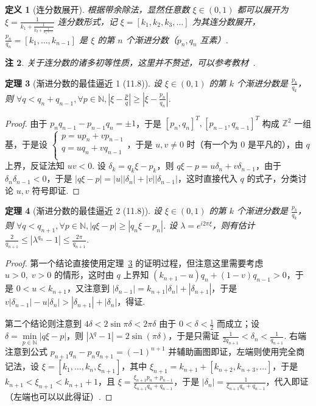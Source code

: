 \documentclass[11pt, a4paper, oneside]{ctexart}
\newtheorem{theorem}{定理}[section]
\newtheorem{definition}[theorem]{定义}
\newtheorem{remark}[theorem]{注}
\newcommand{\N}{\mathbb{N}}
\newcommand{\Z}{\mathbb{Z}}
\newcommand{\abs}[1]{\left|{#1}\right|}
\begin{document}
    \begin{definition}[连分数展开]
        根据带余除法，显然任意数 $\xi\in (0,1)$ 都可以展开为 $\xi=\frac{1}{k_1+\frac{1}{k_2+\frac{1}{k_3+\cdots}}}$ 连分数形式，记 $\xi=[k_1,k_2,k_3,\ldots]$ 为其连分数展开，$\frac{p_n}{q_n}=[k_1,\ldots,k_{n-1}]$ 是 $\xi$ 的第 $n$ 个渐进分数（$p_n,q_n$ 互素）.
    \end{definition}
    \begin{remark}
        关于连分数的诸多初等性质，这里并不赘述，可以参考教材~\cite{zorich}.
    \end{remark}

    \begin{theorem}[渐进分数的最佳逼近 1 (11.8)]\label{定理11.8.1}
        设 $\xi\in (0,1)$ 的第 $k$ 个渐进分数是 $\frac{p_k}{q_k}$，则 $\forall q<q_n+q_{n-1},\forall p\in\N,\abs{\xi-\frac{p}{q}}\geq\abs{\xi-\frac{p_n}{q_n}}$.
    \end{theorem}
    \begin{proof}
        由于 $p_n q_{n-1}-p_{n-1}q_n=\pm 1$，于是 ${[p_n,q_n]}^T,{[p_{n-1},q_{n-1}]}^T$ 构成 $\Z^2$ 一组基，于是设 $\begin{cases}
            p=up_n+vp_{n-1}\\
            q=uq_n+vq_{n-1}\\
        \end{cases}$，于是 $u,v\neq 0$ 时（有一个为 $0$ 是平凡的），由 $q$ 上界，反证法知 $uv<0$. 设 $\delta_k=q_k \xi-p_k$，则 $q\xi-p=u\delta_n+v\delta_{n-1}$，由于 $\delta_n \delta_{n-1}<0$，于是 $\abs{q\xi-p}=\abs{u}\abs{\delta_n}+\abs{v}\abs{\delta_{n-1}}$，这时直接代入 $q$ 的式子，分类讨论 $u,v$ 符号即证.
    \end{proof}

    \begin{theorem}[渐进分数的最佳逼近 2 (11.8)]\label{定理11.8.2}
        设 $\xi\in (0,1)$ 的第 $k$ 个渐进分数是 $\frac{p_k}{q_k}$，则 $\forall q<q_{n+1},\forall p\in\N,\abs{q\xi-p}\geq\abs{q_n \xi-p_n}$. 设 $\lambda=e^{i 2\pi \xi}$，则有估计 $\frac{2}{q_{n+1}}\leq \abs{\lambda^{q_n}-1}\leq \frac{2\pi}{q_{n+1}}$.
    \end{theorem}
    \begin{proof}
        第一个结论直接使用定理~\ref{定理11.8.1} 的证明过程，但注意这里需要考虑 $u>0,\;v>0$ 的情形，这时由 $q$ 上界知 $(k_{n+1}-u)q_n+(1-v)q_{n-1}>0$，于是 $0<u<k_{n+1}$，又注意到 $\abs{\delta_{n-1}}=k_{n+1}\abs{\delta_n}+\abs{\delta_{n+1}}$，于是 $v\abs{\delta_{n-1}}-u\abs{\delta_n}>\abs{\delta_{n+1}}+\abs{\delta_n}$，得证.

        第二个结论则注意到 $4\delta<2\sin\pi \delta<2\pi \delta$ 由于 $0<\delta<\frac{1}{2}$ 而成立；设 $\delta=\min\limits_{p\in\N}\abs{q\xi-p}$，则 $\abs{\lambda^q-1}=2\sin(\pi\delta)$，于是只需证 $\frac{1}{2q_{n+1}}<\delta_n<\frac{1}{q_{n+1}}$. 右端注意到公式 $p_{n+1}q_n-p_n q_{n+1}={(-1)}^{n+1}$ 并辅助画图即证，左端则使用完全商记法，设 $\xi=[k_1,\ldots,k_n,\xi_{n+1}]$，其中 $\xi_{n+1}=k_{n+1}+[k_{n+2},k_{n+3},\ldots]$，于是 $k_{n+1}<\xi_{n+1}<k_{n+1}+1$，且 $\xi=\frac{\xi_{n+1}p_n+p_{n-1}}{\xi_{n+1}q_n+q_{n-1}}$，于是 $\abs{\delta_n}=\frac{1}{\xi_{n+1}q_n+q_{n-1}}$，代入即证（左端也可以以此得证）.
    \end{proof}
\end{document}
